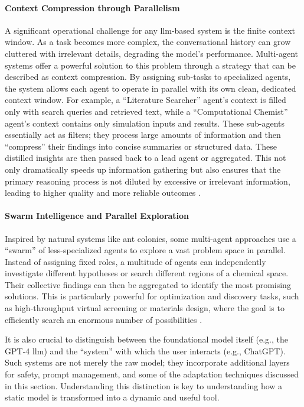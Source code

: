 \paragraph{Context Compression through Parallelism}
A significant operational challenge for any \gls{llm}-based system is the finite context window. 
As a task becomes more complex, the conversational history can grow cluttered with irrelevant details, degrading the model's performance.\autocite{chirkova2025provence0, lee2024long1context} 
Multi-agent systems offer a powerful solution to this problem through a strategy that can be described as context compression. 
By assigning sub-tasks to specialized agents, the system allows each agent to operate in parallel with its own clean, dedicated context window. 
For example, a \enquote{Literature Searcher} agent's context is filled only with search queries and retrieved text, while a \enquote{Computational Chemist} agent's context contains only simulation inputs and results. 
These sub-agents essentially act as filters; they process large amounts of information and then \enquote{compress} their findings into concise summaries or structured data. 
These distilled insights are then passed back to a lead agent or aggregated. 
This not only dramatically speeds up information gathering but also ensures that the primary reasoning process is not diluted by excessive or irrelevant information, leading to higher quality and more reliable outcomes \autocite{Breunig2025HowToFixYourContext}.


\paragraph{Swarm Intelligence and Parallel Exploration}
Inspired by natural systems like ant colonies, some multi-agent approaches use a \enquote{swarm} of less-specialized agents to explore a vast problem space in parallel. Instead of assigning fixed roles, a multitude of agents can independently investigate different hypotheses or search different regions of a chemical space. Their collective findings can then be aggregated to identify the most promising solutions. This is particularly powerful for optimization and discovery tasks, such as high-throughput virtual screening or materials design, where the goal is to efficiently search an enormous number of possibilities \autocite{chen2023agentversefacilitatingmultiagentcollaboration}.


It is also crucial to distinguish between the foundational model itself (e.g., the GPT-4 \gls{llm}) and the \enquote{system} with which the user interacts (e.g., ChatGPT). Such systems are not merely the raw model; they incorporate additional layers for safety, prompt management, and some of the adaptation techniques discussed in this section. Understanding this distinction is key to understanding how a static model is transformed into a dynamic and useful tool.
